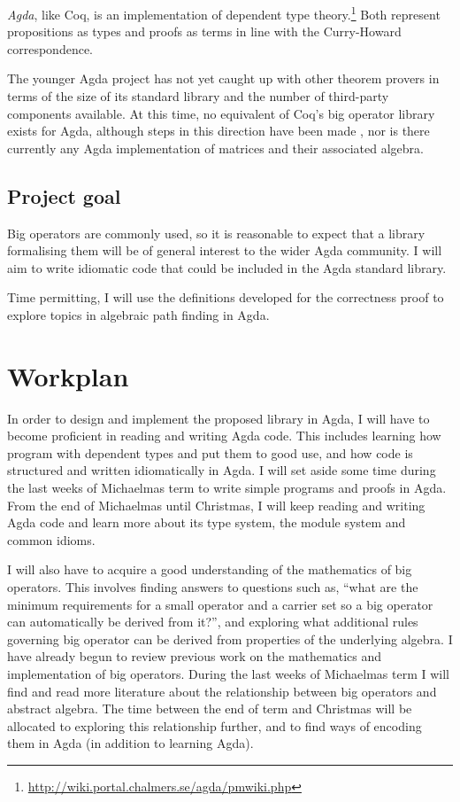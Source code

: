 \documentclass[a4paper]{scrartcl}
\begin{document}
\emph{Agda}, like Coq, is an implementation of dependent type theory.\footnote{\url{http://wiki.portal.chalmers.se/agda/pmwiki.php}} Both represent propositions as types and proofs as terms in line with the Curry-Howard correspondence.

The younger Agda project has not yet caught up with other theorem provers in terms of the size of its standard library and the number of third-party components available. At this time, no equivalent of Coq's big operator library exists for Agda, although steps in this direction have been made \autocite{gustafsson_foldable_2014}, nor is there currently any Agda implementation of matrices and their associated algebra.

\subsection{Project goal}

Big operators are commonly used, so it is reasonable to expect that a library formalising them will be of general interest to the wider Agda community. I will aim to write idiomatic code that could be included in the Agda standard library.

Time permitting, I will use the definitions developed for the correctness proof to explore topics in algebraic path finding in Agda.

\section{Workplan}
\label{workplan}

In order to design and implement the proposed library in Agda, I will have to become proficient in reading and writing Agda code. This includes learning how program with dependent types and put them to good use, and how code is structured and written idiomatically in Agda. I will set aside some time during the last weeks of Michaelmas term to write simple programs and proofs in Agda. From the end of Michaelmas until Christmas, I will keep reading and writing Agda code and learn more about its type system, the module system and common idioms.

I will also have to acquire a good understanding of the mathematics of big operators. This involves finding answers to questions such as, \enquote{what are the minimum requirements for a small operator and a carrier set so a big operator can automatically be derived from it?}, and exploring what additional rules governing big operator can be derived from properties of the underlying algebra. I have already begun to review previous work on the mathematics and implementation of big operators. During the last weeks of Michaelmas term I will find and read more literature about the relationship between big operators and abstract algebra. The time between the end of term and Christmas will be allocated to exploring this relationship further, and to find ways of encoding them in Agda (in addition to learning Agda).
\end{document}
